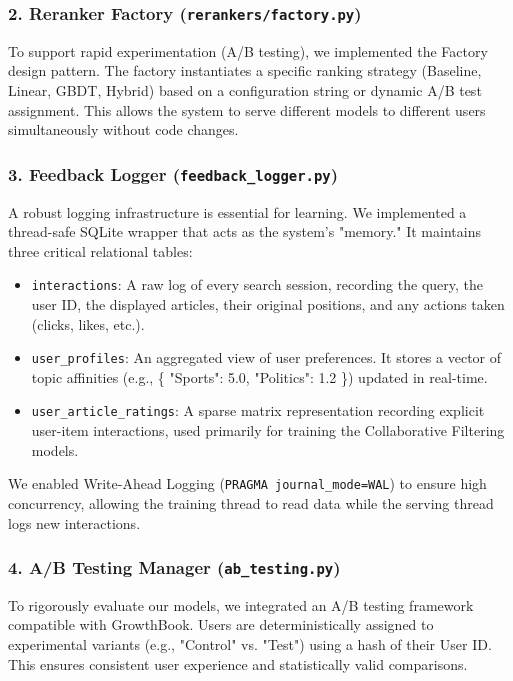 \documentclass[11pt,a4paper]{article}
\begin{document}
\subsubsection{2. Reranker Factory (\texttt{rerankers/factory.py})}
To support rapid experimentation (A/B testing), we implemented the Factory design pattern. The factory instantiates a specific ranking strategy (Baseline, Linear, GBDT, Hybrid) based on a configuration string or dynamic A/B test assignment. This allows the system to serve different models to different users simultaneously without code changes.

\subsubsection{3. Feedback Logger (\texttt{feedback\_logger.py})}
A robust logging infrastructure is essential for learning. We implemented a thread-safe SQLite wrapper that acts as the system's "memory." It maintains three critical relational tables:
\begin{itemize}
    \item \texttt{interactions}: A raw log of every search session, recording the query, the user ID, the displayed articles, their original positions, and any actions taken (clicks, likes, etc.).
    \item \texttt{user\_profiles}: An aggregated view of user preferences. It stores a vector of topic affinities (e.g., \{ "Sports": 5.0, "Politics": 1.2 \}) updated in real-time.
    \item \texttt{user\_article\_ratings}: A sparse matrix representation recording explicit user-item interactions, used primarily for training the Collaborative Filtering models.
\end{itemize}
We enabled Write-Ahead Logging (\texttt{PRAGMA journal\_mode=WAL}) to ensure high concurrency, allowing the training thread to read data while the serving thread logs new interactions.

\subsubsection{4. A/B Testing Manager (\texttt{ab\_testing.py})}
To rigorously evaluate our models, we integrated an A/B testing framework compatible with GrowthBook. Users are deterministically assigned to experimental variants (e.g., "Control" vs. "Test") using a hash of their User ID. This ensures consistent user experience and statistically valid comparisons.
\end{document}
